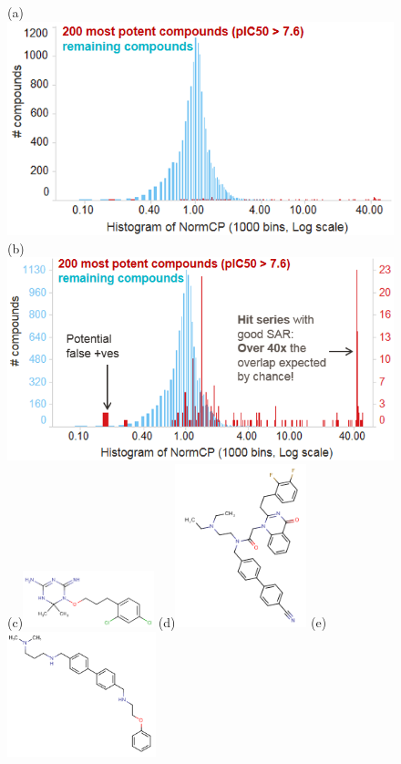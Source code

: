 \documentclass[journal=jacsat,biochem,manuscript=article]{achemso}
\begin{document}
\begin{figure}
  (a)\includegraphics[width=4.5in]{fig/NormCP_all.png}\\
  (b)\includegraphics[width=4.5in]{fig/NormCP_top200.png}\\
  (c)\includegraphics[width=1.5in]{fig/NormCP=42_5_pIC50=8_49_CID524739.png}
  (d)\includegraphics[width=1.5in]{fig/NormCP=0_17_pIC50=8_22_CID541941.png}
  (e)\includegraphics[width=1.7in]{fig/NormCP=0_16_pIC50=7_73_CID531249.png}  

\end{figure}
\end{document}
